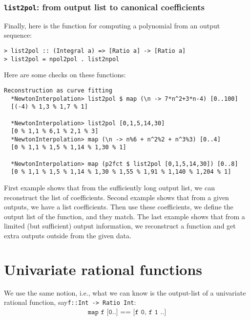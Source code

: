 \documentclass[11pt]{book}
\begin{document}
\subsubsection{\texttt{list2pol}: from output list to canonical coefficients}
Finally, here is the function for computing a polynomial from an output sequence:
\begin{verbatim}
> list2pol :: (Integral a) => [Ratio a] -> [Ratio a]
> list2pol = npol2pol . list2npol
\end{verbatim}
Here are some checks on these functions:
\begin{verbatim}
Reconstruction as curve fitting
  *NewtonInterpolation> list2pol $ map (\n -> 7*n^2+3*n-4) [0..100]
  [(-4) % 1,3 % 1,7 % 1]

  *NewtonInterpolation> list2pol [0,1,5,14,30]
  [0 % 1,1 % 6,1 % 2,1 % 3]
  *NewtonInterpolation> map (\n -> n%6 + n^2%2 + n^3%3) [0..4]
  [0 % 1,1 % 1,5 % 1,14 % 1,30 % 1]

  *NewtonInterpolation> map (p2fct $ list2pol [0,1,5,14,30]) [0..8]
  [0 % 1,1 % 1,5 % 1,14 % 1,30 % 1,55 % 1,91 % 1,140 % 1,204 % 1]

\end{verbatim}
First example shows that from the sufficiently long output list, we can reconstruct the list of coefficients.
Second example shows that from a given outputs, we have a list coefficients.
Then use these coefficients, we define the output list of the function, and they match.
The last example shows that from a limited (but sufficient) output information, we reconstruct a function and get extra outputs outside from the given data.

\section{Univariate rational functions}
We use the same notion, i.e., what we can know is the output-list of a univariate rational function, say\texttt{f::Int -> Ratio Int}:
\begin{eqnarray}
\texttt{map f [0..] == [f 0, f 1 ..]}
\end{eqnarray}
\end{document}
